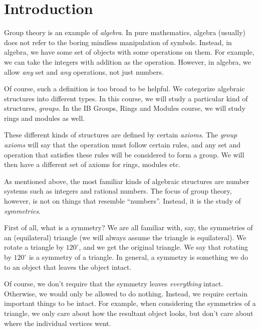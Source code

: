 \documentclass[a4paper]{article}
\begin{document}
\setcounter{section}{-1}
\section{Introduction}
Group theory is an example of \emph{algebra}. In pure mathematics, algebra (usually) does not refer to the boring mindless manipulation of symbols. Instead, in algebra, we have some set of objects with some operations on them. For example, we can take the integers with addition as the operation. However, in algebra, we allow \emph{any} set and \emph{any} operations, not just numbers.

Of course, such a definition is too broad to be helpful. We categorize algebraic structures into different types. In this course, we will study a particular kind of structures, \emph{groups}. In the IB Groups, Rings and Modules course, we will study rings and modules as well.

These different kinds of structures are defined by certain \emph{axioms}. The \emph{group axioms} will say that the operation must follow certain rules, and any set and operation that satisfies these rules will be considered to form a group. We will then have a different set of axioms for rings, modules etc.

As mentioned above, the most familiar kinds of algebraic structures are number systems such as integers and rational numbers. The focus of group theory, however, is not on things that resemble ``numbers''. Instead, it is the study of \emph{symmetries}.

First of all, what is a symmetry? We are all familiar with, say, the symmetries of an (equilateral) triangle (we will always assume the triangle is equilateral). We rotate a triangle by $120^\circ$, and we get the original triangle. We say that rotating by $120^\circ$ is a symmetry of a triangle. In general, a symmetry is something we do to an object that leaves the object intact.

Of course, we don't require that the symmetry leaves \emph{everything} intact. Otherwise, we would only be allowed to do nothing. Instead, we require certain important things to be intact. For example, when considering the symmetries of a triangle, we only care about how the resultant object looks, but don't care about where the individual vertices went.
\end{document}
